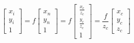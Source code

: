 \begin{equation}
  \begin{bmatrix} 
    x_i \\ y_i \\ 1
  \end{bmatrix} 
  = f
    \begin{bmatrix} 
      x_n \\ y_n \\ 1
    \end{bmatrix} 
  = f
    \begin{bmatrix} 
      \frac{x_c}{z_c} \\
      \frac{y_c}{z_c} \\
      1
    \end{bmatrix} 
  = \frac{f}{z_c}
    \begin{bmatrix} 
      x_c \\ y_c \\ z_c
    \end{bmatrix} 
\label{eq:idp3}
\end{equation}